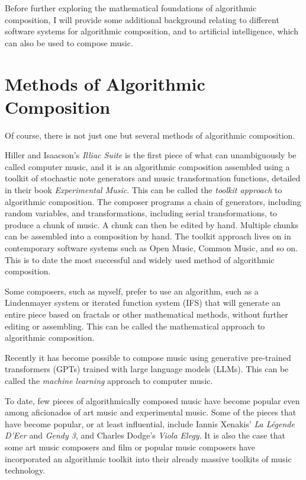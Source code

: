 \documentclass[11pt]{amsart}
\begin{document}
Before further exploring the mathematical foundations of algorithmic composition, I will provide some additional background relating to different software systems for algorithmic composition, and to artificial intelligence, which can also be used to compose music.

\section{Methods of Algorithmic Composition}

Of course, there is not just one but several methods of algorithmic composition.

Hiller and Isaacson's \emph{Illiac Suite} is the first piece of what can unambiguously be called computer music, and it is an algorithmic composition assembled using a toolkit of stochastic note generators and music transformation functions, detailed in their book \emph{Experimental Music}. This can be called the \emph{toolkit approach} to algorithmic composition. The composer programs a chain of generators, including random variables, and transformations, including serial transformations, to produce a chunk of music. A chunk can then be edited by hand. Multiple chunks can be assembled into a composition by hand. The toolkit approach lives on in contemporary software systems such as Open Music, Common Music, and so on. This is to date the most successful and widely used method of algorithmic composition.

Some composers, such as myself, prefer to use an algorithm, such as a Lindenmayer system or iterated function system (IFS) that will generate an entire piece based on fractals or other mathematical methods, without further editing or assembling. This can be called the {mathematical approach} to algorithmic composition.

Recently it has become possible to compose music using generative pre-trained transformers (GPTs) trained with large language models (LLMs). This can be called the \emph{machine learning} approach to computer music.

To date, few pieces of algorithmically composed music have become popular even among aficionados of art music and experimental music. Some of the pieces that have become popular, or at least influential, include Iannis Xenakis' \emph{La Légende D'Eer} and \emph{Gendy 3}, and Charles Dodge's \emph{Viola Elegy}. It is also the case that some art music composers and film or popular music composers have incorporated an algorithmic toolkit into their already massive toolkits of music technology.
\end{document}

